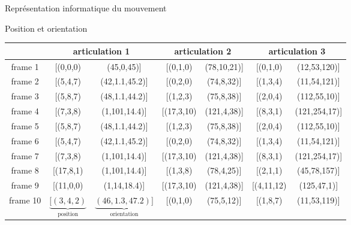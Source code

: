     \begin{frame}{Représentation informatique du mouvement}
        \begin{center}Position et orientation\end{center}
        \begin{table}
            \begin{adjustbox}{max width=\textwidth}
                \begin{tabular}{c|cccccc}
                & \multicolumn{2}{c}{articulation 1}  & \multicolumn{2}{c}{articulation 2} & \multicolumn{2}{c}{articulation 3}\\\hline
                frame 1 & [(0,0,0) & (45,0,45)]     & [(0,1,0)  & (78,10,21)]   & [(0,1,0) & (12,53,120)]\\
                frame 2 & [(5,4,7) & (42,1.1,45.2)] & [(0,2,0)  & (74,8,32)]    & [(1,3,4) & (11,54,121)]\\
                frame 3 & [(5,8,7) & (48,1.1,44.2)] & [(1,2,3)  & (75,8,38)]    & [(2,0,4) & (112,55,10)]\\
                frame 4 & [(7,3,8) & (1,101,14.4)]  & [(17,3,10)  & (121,4,38)]    & [(8,3,1) & (121,254,17)]\\
                frame 5 & [(5,8,7) & (48,1.1,44.2)] & [(1,2,3)  & (75,8,38)]    & [(2,0,4) & (112,55,10)]\\
                frame 6 & [(5,4,7) & (42,1.1,45.2)] & [(0,2,0)  & (74,8,32)]    & [(1,3,4) & (11,54,121)]\\
                frame 7 & [(7,3,8) & (1,101,14.4)]  & [(17,3,10)  & (121,4,38)]    & [(8,3,1) & (121,254,17)]\\
                frame 8 & [(17,8,1) & (1,101,14.4)]  & [(1,3,8)  & (78,4,25)]    & [(2,1,1) & (45,78,157)]\\
                frame 9 & [(11,0,0) & (1,14,18.4)]  & [(17,3,10)  & (121,4,38)]    & [(4,11,12) & (125,47,1)]\\
                frame 10 & $\underbrace{[(3,4,2)}_\text{position}$ & $\underbrace{(46,1.3,47.2)]}_\text{orientation}$ & [(0,1,0) & (75,5,12)] & [(1,8,7) & (11,53,119)]\\
                \end{tabular}
            \end{adjustbox}
        \end{table}
    \end{frame}
    
